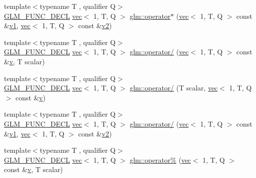 \begin{DoxyCompactItemize}
\item 
{\footnotesize template$<$typename T , qualifier Q$>$ }\\\mbox{\hyperlink{setup_8hpp_ab2d052de21a70539923e9bcbf6e83a51}{G\+L\+M\+\_\+\+F\+U\+N\+C\+\_\+\+D\+E\+CL}} \mbox{\hyperlink{structglm_1_1vec}{vec}}$<$ 1, T, Q $>$ \mbox{\hyperlink{group__ext__vec1_ga902773a560c5478d0a2c0e5d8343b504}{glm\+::operator$\ast$}} (\mbox{\hyperlink{structglm_1_1vec}{vec}}$<$ 1, T, Q $>$ const \&\mbox{\hyperlink{_s_d_l__opengl__glext_8h_a435c176a02c061b43e19bdf7c86cceae}{v1}}, \mbox{\hyperlink{structglm_1_1vec}{vec}}$<$ 1, T, Q $>$ const \&\mbox{\hyperlink{_s_d_l__opengl__glext_8h_a0928f6d0f0f794ba000a21dfae422136}{v2}})
\item 
{\footnotesize template$<$typename T , qualifier Q$>$ }\\\mbox{\hyperlink{setup_8hpp_ab2d052de21a70539923e9bcbf6e83a51}{G\+L\+M\+\_\+\+F\+U\+N\+C\+\_\+\+D\+E\+CL}} \mbox{\hyperlink{structglm_1_1vec}{vec}}$<$ 1, T, Q $>$ \mbox{\hyperlink{group__ext__vec1_ga5f0627715e89fde4a13b5655961df660}{glm\+::operator/}} (\mbox{\hyperlink{structglm_1_1vec}{vec}}$<$ 1, T, Q $>$ const \&\mbox{\hyperlink{_s_d_l__opengl_8h_a10a82eabcb59d2fcd74acee063775f90}{v}}, T scalar)
\item 
{\footnotesize template$<$typename T , qualifier Q$>$ }\\\mbox{\hyperlink{setup_8hpp_ab2d052de21a70539923e9bcbf6e83a51}{G\+L\+M\+\_\+\+F\+U\+N\+C\+\_\+\+D\+E\+CL}} \mbox{\hyperlink{structglm_1_1vec}{vec}}$<$ 1, T, Q $>$ \mbox{\hyperlink{group__ext__vec1_ga851316b0b0cb8d83400d192036a1b128}{glm\+::operator/}} (T scalar, \mbox{\hyperlink{structglm_1_1vec}{vec}}$<$ 1, T, Q $>$ const \&\mbox{\hyperlink{_s_d_l__opengl_8h_a10a82eabcb59d2fcd74acee063775f90}{v}})
\item 
{\footnotesize template$<$typename T , qualifier Q$>$ }\\\mbox{\hyperlink{setup_8hpp_ab2d052de21a70539923e9bcbf6e83a51}{G\+L\+M\+\_\+\+F\+U\+N\+C\+\_\+\+D\+E\+CL}} \mbox{\hyperlink{structglm_1_1vec}{vec}}$<$ 1, T, Q $>$ \mbox{\hyperlink{group__ext__vec1_ga1199db3fccd25c9b695894159fa12ac8}{glm\+::operator/}} (\mbox{\hyperlink{structglm_1_1vec}{vec}}$<$ 1, T, Q $>$ const \&\mbox{\hyperlink{_s_d_l__opengl__glext_8h_a435c176a02c061b43e19bdf7c86cceae}{v1}}, \mbox{\hyperlink{structglm_1_1vec}{vec}}$<$ 1, T, Q $>$ const \&\mbox{\hyperlink{_s_d_l__opengl__glext_8h_a0928f6d0f0f794ba000a21dfae422136}{v2}})
\item 
{\footnotesize template$<$typename T , qualifier Q$>$ }\\\mbox{\hyperlink{setup_8hpp_ab2d052de21a70539923e9bcbf6e83a51}{G\+L\+M\+\_\+\+F\+U\+N\+C\+\_\+\+D\+E\+CL}} \mbox{\hyperlink{structglm_1_1vec}{vec}}$<$ 1, T, Q $>$ \mbox{\hyperlink{group__ext__vec1_gac7110fb284669c629075b3ab29ad9b4f}{glm\+::operator\%}} (\mbox{\hyperlink{structglm_1_1vec}{vec}}$<$ 1, T, Q $>$ const \&\mbox{\hyperlink{_s_d_l__opengl_8h_a10a82eabcb59d2fcd74acee063775f90}{v}}, T scalar)

\end{DoxyCompactItemize}
